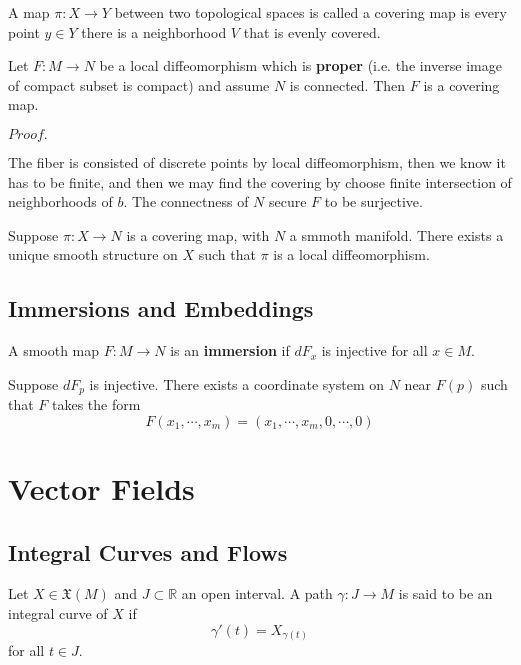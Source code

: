 \documentclass{article}
\newcommand{\Pf}[1]{$Proof.$\par}
\begin{document}
\begin{definition}
    A map $\pi:X\to Y$ between two topological spaces is called a covering map is every point $y\in Y$ there is a neighborhood $V$ that is evenly covered.
\end{definition}

\begin{proposition}
    Let $F:M\to N$ be a local diffeomorphism which is \textbf{proper} (i.e. the inverse image of compact subset is compact) and assume $N$ is connected. Then $F$ is a covering map.
\end{proposition}
\Pf\par
    The fiber is consisted of discrete points by local diffeomorphism, then we know it has to be finite, and then we may find the covering by choose finite intersection of neighborhoods of $b$. The connectness of $N$ secure $F$ to be surjective.

\begin{proposition}
    Suppose $\pi:X\to N$ is a covering map, with $N$ a smmoth manifold. There exists a unique smooth structure on $X$ such that $\pi$ is a local diffeomorphism.
\end{proposition}

\subsection{Immersions and Embeddings}

\begin{definition}
    A smooth map $F:M\to N$ is an \textbf{immersion} if $dF_x$ is injective for all $x\in M$.
\end{definition}

\begin{proposition}
    Suppose $dF_p$ is injective. There exists a coordinate system on $N$ near $F(p)$ such that $F$ takes the form
    \[F(x_1,\cdots,x_m) = (x_1,\cdots, x_m, 0,\cdots, 0)\]
\end{proposition}

\section{Vector Fields}

\subsection{Integral Curves and Flows}

\begin{definition}
    Let $X\in\mathfrak{X}(M)$ and $J\subset \mathbb{R}$ an open interval. A path $\gamma:J\to M$ is said to be an integral curve of $X$ if
    \[\gamma'(t) = X_{\gamma(t)}\]
    for all $t\in J$.
\end{definition}







\end{document}
